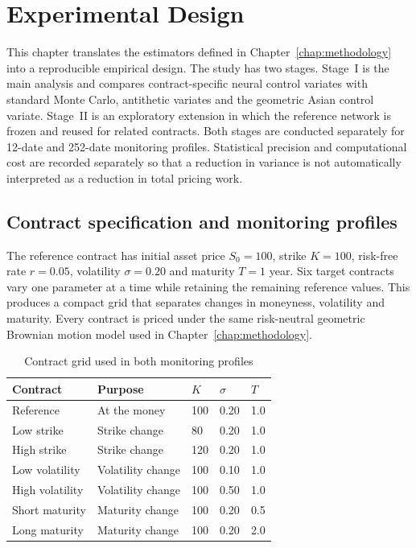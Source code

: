 \chapter{Experimental Design}
\label{chap:experimental_design}

This chapter translates the estimators defined in Chapter~\ref{chap:methodology} into a reproducible empirical design. The study has two stages. Stage~I is the main analysis and compares contract-specific neural control variates with standard Monte Carlo, antithetic variates and the geometric Asian control variate. Stage~II is an exploratory extension in which the reference network is frozen and reused for related contracts. Both stages are conducted separately for 12-date and 252-date monitoring profiles. Statistical precision and computational cost are recorded separately so that a reduction in variance is not automatically interpreted as a reduction in total pricing work.

\section{Contract specification and monitoring profiles}

The reference contract has initial asset price $S_0 = 100$, strike $K = 100$, risk-free rate $r = 0.05$, volatility $\sigma = 0.20$ and maturity $T = 1$ year. Six target contracts vary one parameter at a time while retaining the remaining reference values. This produces a compact grid that separates changes in moneyness, volatility and maturity. Every contract is priced under the same risk-neutral geometric Brownian motion model used in Chapter~\ref{chap:methodology}.

\begin{table}[htbp]
    \centering
    \caption{Contract grid used in both monitoring profiles}
    \label{tab:contract_grid}
    \begin{tabular}{lllll}
        \hline
        Contract & Purpose & $K$ & $\sigma$ & $T$ \\
        \hline
        Reference & At the money & 100 & 0.20 & 1.0 \\
        Low strike & Strike change & 80 & 0.20 & 1.0 \\
        High strike & Strike change & 120 & 0.20 & 1.0 \\
        Low volatility & Volatility change & 100 & 0.10 & 1.0 \\
        High volatility & Volatility change & 100 & 0.50 & 1.0 \\
        Short maturity & Maturity change & 100 & 0.20 & 0.5 \\
        Long maturity & Maturity change & 100 & 0.20 & 2.0 \\
        \hline
    \end{tabular}
\end{table}

